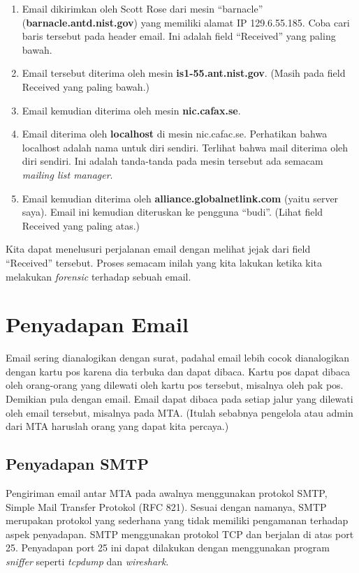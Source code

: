 \begin{enumerate}
   \item Email dikirimkan oleh Scott Rose dari mesin ``barnacle''
      ({\bf barnacle.antd.nist.gov}) yang memiliki alamat IP 129.6.55.185. 
      Coba cari baris tersebut pada header email. Ini adalah field 
      ``Received'' yang paling bawah.
   \item Email tersebut diterima oleh mesin {\bf is1-55.ant.nist.gov}.
      (Masih pada field Received yang paling bawah.)
   \item Email kemudian diterima oleh mesin {\bf nic.cafax.se}.
   \item Email diterima oleh {\bf localhost} di mesin nic.cafac.se. Perhatikan
      bahwa localhost adalah nama untuk diri sendiri. Terlihat bahwa mail
      diterima oleh diri sendiri. Ini adalah tanda-tanda pada mesin tersebut
      ada semacam {\em mailing list manager}. 
   \item Email kemudian diterima oleh {\bf alliance.globalnetlink.com} 
      (yaitu server saya). Email ini kemudian diteruskan ke pengguna 
      ``budi''. (Lihat field Received yang paling atas.)
\end{enumerate}

Kita dapat menelusuri perjalanan email dengan melihat jejak dari field
``Received'' tersebut. Proses semacam inilah yang kita lakukan ketika kita
melakukan {\em forensic} terhadap sebuah email.

\section{Penyadapan Email}
Email sering dianalogikan dengan surat, padahal email lebih cocok dianalogikan
dengan kartu pos karena dia terbuka dan dapat dibaca. Kartu pos dapat dibaca
oleh orang-orang yang dilewati oleh kartu pos tersebut, misalnya oleh pak pos.
Demikian pula dengan email. Email dapat dibaca pada setiap jalur yang dilewati
oleh email tersebut, misalnya pada MTA. (Itulah sebabnya pengelola atau admin
dari MTA haruslah orang yang dapat kita percaya.)

\subsection{Penyadapan SMTP}

Pengiriman email antar MTA pada awalnya menggunakan protokol SMTP, Simple Mail
Transfer Protokol (RFC 821). Sesuai dengan namanya, SMTP merupakan protokol
yang sederhana yang tidak memiliki pengamanan terhadap aspek penyadapan. SMTP
menggunakan protokol TCP dan berjalan di atas port 25. Penyadapan port 25 ini
dapat dilakukan dengan menggunakan program {\em sniffer} seperti {\em tcpdump}
dan {\em wireshark}.

